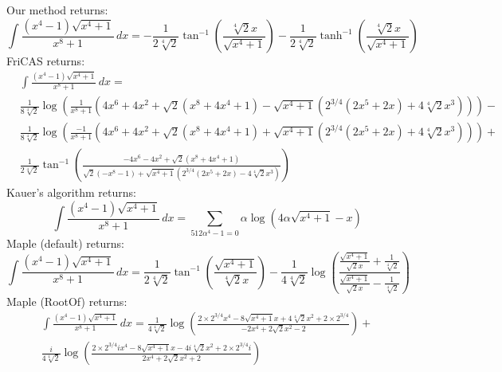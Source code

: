 \documentclass[12pt]{article}
\numberwithin{equation}{section}
\theoremstyle{definition}
\begin{document}
\noindent Our method returns:
\small
\begin{equation*}
\int \frac{\left(x^4-1\right) \sqrt{x^4+1}}{x^8+1} \, dx= 
-\frac{1}{2 \sqrt[4]{2}}\tan ^{-1}\left(\frac{\sqrt[4]{2} x}{\sqrt{x^4+1}}\right) - 
\frac{1}{2 \sqrt[4]{2}}\tanh^{-1}\left(\frac{\sqrt[4]{2} x}{\sqrt{x^4+1}}\right)
\end{equation*}
\normalsize
FriCAS returns:
\small
\begin{align*}
& \int \frac{\left(x^4-1\right) \sqrt{x^4+1}}{x^8+1} \, dx = \\
& \frac{1}{8 \sqrt[4]{2}}\log\left(\frac{1}{x^8+1}\left(4 x^6+4 x^2+\sqrt{2} \left(x^8+4x^4+1\right)
-\sqrt{x^4+1} \left(2^{3/4} \left(2 x^5+2 x\right)+4 \sqrt[4]{2} x^3\right)\right)\right) - \\
&\frac{1}{8 \sqrt[4]{2}}\log \left(\frac{-1}{x^8+1}\left(4x^6+4 x^2+\sqrt{2} \left(x^8+4 x^4+1\right)+
\sqrt{x^4+1} \left(2^{3/4} \left(2 x^5+2 x\right)+4 \sqrt[4]{2} x^3\right)\right)\right) + \\
& \frac{1}{2\sqrt[4]{2}}\tan ^{-1}\left(\frac{-4 x^6-4 x^2+\sqrt{2} \left(x^8+4 x^4+1\right)}{\sqrt{2} \left(-x^8-1\right)+\sqrt{x^4+1} \left(2^{3/4} \left(2x^5+2 x\right)-4 \sqrt[4]{2} x^3\right)}\right)
\end{align*}
\normalsize
Kauer's algorithm returns: 
\small
$$\int \frac{\left(x^4-1\right) \sqrt{x^4+1}}{x^8+1} \, dx = 
\sum_{512 \alpha ^4-1=0}\alpha  \log \left(4 \alpha  \sqrt{x^4+1}-x\right)$$
\normalsize
Maple (default) returns:
\small
$$\int \frac{\left(x^4-1\right) \sqrt{x^4+1}}{x^8+1} \, dx = 
\frac{1}{2 \sqrt[4]{2}} \tan ^{-1}\left(\frac{\sqrt{x^4+1}}{\sqrt[4]{2} x}\right) - 
\frac{1}{4 \sqrt[4]{2}} \log\left(\frac{\frac{\sqrt{x^4+1}}{\sqrt{2} x}+\frac{1}{\sqrt[4]{2}}}{\frac{\sqrt{x^4+1}}{\sqrt{2} x}-\frac{1}{\sqrt[4]{2}}}\right)$$
\normalsize
Maple (RootOf) returns:
\small
\begin{multline*}
\int \frac{\left(x^4-1\right) \sqrt{x^4+1}}{x^8+1} \, dx = 
\frac{1}{4 \sqrt[4]{2}}\log \left(\frac{2\times2^{3/4} x^4-8 \sqrt{x^4+1} x+4 \sqrt[4]{2} x^2+2\times2^{3/4}}{-2 x^4+2 \sqrt{2} x^2-2}\right) + \\
\frac{i}{4 \sqrt[4]{2}}\log \left(\frac{2\times2^{3/4} i x^4-8 \sqrt{x^4+1} x-4 i \sqrt[4]{2} x^2+2\times2^{3/4} i}{2 x^4+2 \sqrt{2} x^2+2}\right)
\end{multline*}
\end{document}
